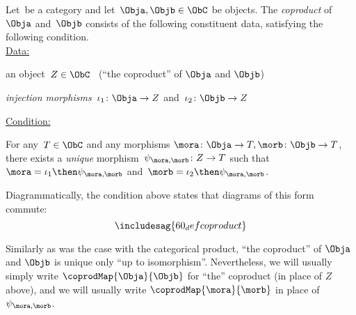 \begin{ctdefinition}[Coproduct]
\label{def:catcoproduct}
Let~\CatC be a category and let~$\Obja, \Objb \in \ObC$ be objects. The \emph{coproduct} of~$\Obja$ and~$\Objb$ consists of the following constituent data, satisfying the following condition. \\
\underline{Data:}
\begin{compactenum}
\item an object~$Z \in \ObC$ \ (``the coproduct'' of $\Obja$ and $\Objb$)
\item \emph{injection morphisms}~$\iota_1 \colon \Obja \to Z $ and~$\iota_2 \colon \Objb \to Z$
\end{compactenum}
\underline{Condition:}
\begin{compactenum}
\item For any~$T \in \ObC$ and any morphisms $\mora \colon  \Obja \to T, \morb \colon \Objb \to T$, there exists a \emph{unique} morphism~$\psi_{\mora, \morb} \colon Z \to T$ such that~$\mora = \iota_1\then \psi_{\mora, \morb}$ and~$\morb = \iota_2 \then \psi_{\mora,\morb}$.
\end{compactenum}
\end{ctdefinition}


\begin{remark}
Diagrammatically, the condition above states that diagrams of this form commute:
\begin{equation}
\includesag{60_defcoproduct}
\end{equation}
\end{remark}

\begin{remark}
Similarly as was the case with the categorical product, ``the coproduct'' of $\Obja$ and $\Objb$ is unique only ``up to isomorphism''. Nevertheless, we will usually simply write $\coprodMap{\Obja}{\Objb}$ for ``the'' coproduct (in place of $Z$ above), and we will usually write $\coprodMap{\mora}{\morb}$ in place of $\psi_{\mora, \morb}$.
\end{remark}

%
%


%

